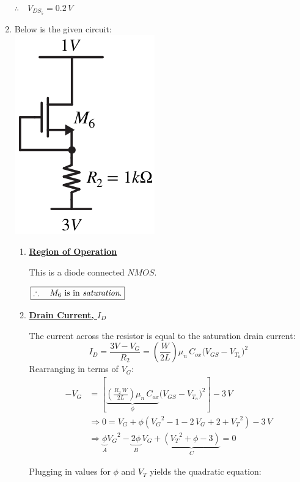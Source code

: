 \documentclass[12pt, fleqn]{article}
\begin{document}
\begin{enumerate}[label=(\alph*)]
{\begin{enumerate}[label=(\roman*)]
        \vspace{0.5cm}
        $\boxed{\therefore\quad V_{{DS}_5} = 0.2\,V}$
    \end{enumerate}
    }
    \newpage\noindent
    \item
    {
    Below is the given circuit:\\
    \includegraphics[scale=0.55, center]{p1e.png}\\
    \begin{enumerate}[label=(\roman*)]
        \item
        {
        \underline{\textbf{Region of Operation}}
        
        \vspace{0.15cm}
        This is a diode connected $NMOS$.
        
        $\boxed{\therefore\quad{\text{$M_6$ is in \textit{saturation}.}}}$
        }
        \vspace{0.25cm}
        \item
        {
        \underline{\textbf{Drain Current, $I_D$}}
        
        \vspace{0.15cm}
        The current across the resistor is equal to the saturation drain current:
        \begin{equation}
            I_D = \frac{3V - V_G}{R_2} = \left(\frac{W}{2L}\right) \mu_n\,C_{ox} {\big(V_{GS} - V_{T_n}\big)}^2
        \end{equation}
        Rearranging in terms of $V_G$:
        \begin{align*}
            -V_G &= \left[\underbrace{\left(\frac{R_2\,W}{2L}\right) \mu_n\,C_{ox}}_\phi {\big(V_{GS} - V_{T_n}\big)}^2\right] - 3\,V\\[0.25cm]
            &\Longrightarrow 0 = V_G + \phi({V_G}^2 - 1 - 2\,V_G + 2 + {V_T}^2) - 3\,V\\[0.25cm]
            &\Longrightarrow \underbrace{\phi}_A {V_G}^2 - \underbrace{2\phi}_B\,V_G + \underbrace{({V_T}^2 + \phi - 3)}_C = 0
        \end{align*}
        }
        Plugging in values for $\phi$ and $V_T$ yields the quadratic equation:
        

\end{enumerate}}
\end{enumerate}
\end{document}
